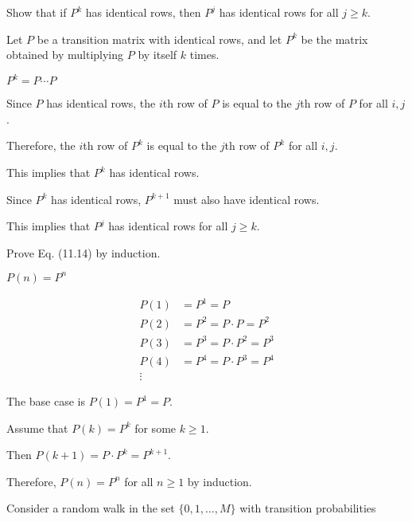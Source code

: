 \documentclass[answers]{exam}
\begin{document}
\begin{questions}
\begin{solution}
\end{solution}


    Show that if $P^k$ has identical rows, then $P^j$ has identical rows for all $j
        \geq k$.
    \begin{solution}
        Let \(P\) be a transition matrix with identical rows, and let \(P^k\) be the matrix obtained by multiplying \(P\) by itself \(k\) times.

        \(P^k = P\cdots P\)

        Since \(P\) has identical rows, the \(i\)th row of \(P\) is equal to the
        \(j\)th row of \(P\) for all \(i, j\).

        Therefore, the \(i\)th row of \(P^k\) is equal to the \(j\)th row of \(P^k\)
        for all \(i, j\).

        This implies that \(P^k\) has identical rows.

        Since \(P^k\) has identical rows, \(P^{k+1}\) must also have identical rows.

        This implies that \(P^j\) has identical rows for all \(j \geq k\).
    \end{solution}


    Prove Eq. (11.14) by induction.

    \(P(n) = P^n\)
    \begin{solution}
        \begin{align*}
            P(1) & = P^1 = P                 \\
            P(2) & = P^2 = P \cdot P = P^2   \\
            P(3) & = P^3 = P \cdot P^2 = P^3 \\
            P(4) & = P^4 = P \cdot P^3 = P^4 \\
            \vdots
        \end{align*}

        The base case is \(P(1) = P^1 = P\).

        Assume that \(P(k) = P^k\) for some \(k \geq 1\).

        Then \(P(k+1) = P \cdot P^k = P^{k+1}\).

        Therefore, \(P(n) = P^n\) for all \(n \geq 1\) by induction.
    \end{solution}


    Consider a random walk in the set $\{0, 1, \dots, M\}$ with transition
    probabilities


\end{questions}
\end{document}

